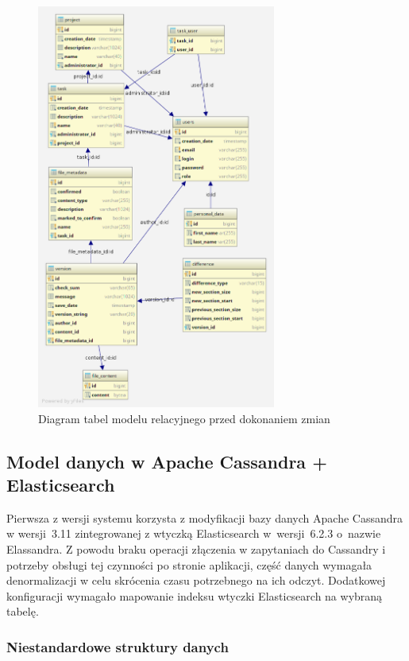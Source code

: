 \begin{figure}[!ht]
\centering
\includegraphics[width=0.7\textwidth]{figures/diagram_przed.png}
\caption{Diagram tabel modelu relacyjnego przed dokonaniem zmian}
\label{fig:ModelPrzed}
\end{figure}

\subsection{Model danych w Apache Cassandra + Elasticsearch} \label{sec:ModelDanychCassandra}

Pierwsza z wersji systemu korzysta z modyfikacji bazy danych Apache Cassandra w wersji~3.11 zintegrowanej z wtyczką Elasticsearch w~wersji~6.2.3 o~nazwie Elassandra.
Z powodu braku operacji złączenia w zapytaniach do Cassandry i potrzeby obsługi tej czynności po stronie aplikacji, część danych wymagała denormalizacji w celu skrócenia czasu potrzebnego na ich odczyt.
Dodatkowej konfiguracji wymagało mapowanie indeksu wtyczki Elasticsearch na wybraną tabelę.

\subsubsection{Niestandardowe struktury danych} \label{sec:cassadnraUDFs}

